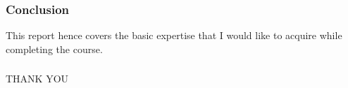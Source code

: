 \documentclass{beamer}
\begin{document}
\begin{frame}
\frametitle{Conclusion}

This report hence covers the basic expertise that I would like to acquire while completing the course.




\end{frame}
\begin{frame}
\frametitle{}
\begin{Huge}
\begin{center}
THANK YOU  
\end{center} 
\end{Huge}


\end{frame}
\end{document}
